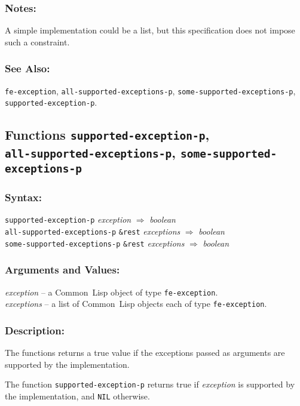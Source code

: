 \documentclass[fleqn]{article}
\newcommand{\CL}{\textsf{Common~Lisp}}
\newcommand{\code}[1]{\texttt{#1}}
\newcommand{\varname}[1]{\textit{#1}}
\newcommand{\DDictionaryItem}[1]{\vspace*{6pt}\noindent\hrulefill\vspace*{-9pt}\subsection*{#1}}
\begin{document}
\subsubsection*{Notes:}

A simple implementation could be a list, but this specification does
not impose such a constraint.


\subsubsection*{See Also:}

\code{fe-exception}, \code{all-supported-exceptions-p},
\code{some-supported-exceptions-p},\\
\code{supported-exception-p}.


\DDictionaryItem{Functions \code{supported-exception-p},\\
  \code{all-supported-exceptions-p},
  \code{some-supported-exceptions-p}}

\subsubsection*{Syntax:}

\code{supported-exception-p}
\varname{exception} $\Rightarrow$ \textit{boolean}\\
\code{all-supported-exceptions-p} \code{\&rest}
\varname{exceptions} $\Rightarrow$ \textit{boolean}\\
\code{some-supported-exceptions-p} \code{\&rest}
\varname{exceptions} $\Rightarrow$ \textit{boolean}

\subsubsection*{Arguments and Values:}

\varname{exception} -- a \CL{} object of type 
\code{fe-exception}.\\
\varname{exceptions} -- a list of \CL{} objects each of type 
\code{fe-exception}.


\subsubsection*{Description:}

The functions returns a true value if the exceptions passed as
arguments are supported by the implementation.

The function \code{supported-exception-p} returns true if 
\varname{exception} is supported by the implementation, and \code{NIL}
otherwise.
\end{document}
